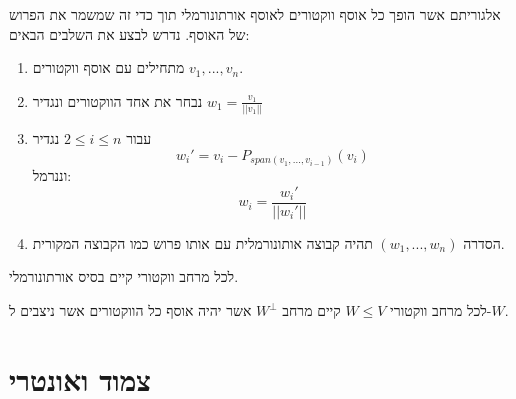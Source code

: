 \documentclass{tstextbook}
\begin{document}
\begin{proposition}
אלגוריתם אשר הופך כל אוסף ווקטורים לאוסף אורתונורמלי תוך כדי זה שמשמר את הפרוש של האוסף. נדרש לבצע את השלבים הבאים:

  \begin{enumerate}
    \item מתחילים עם אוסף ווקטורים \(v_1,...,v_n\).  


    \item נבחר את אחד הווקטורים ונגדיר \(w_1=\frac{v_1}{||v_1||}\)


    \item עבור \(2\leq i \leq n\) נגדיר 
$$w_i' = v_i - P_{span(v_1,..., v_{i-1})} (v_i)$$
וננרמל:    $$w_i = \frac{w_i'}{||w_i'||}$$


    \item הסדרה \((w_1,...,w_n)\) תהיה קבוצה אותונורמלית עם אותו פרוש כמו הקבוצה המקורית. 


  \end{enumerate}
\end{proposition}
\begin{corollary}
לכל מרחב ווקטורי קיים בסיס אורתונורמלי.

\end{corollary}
\begin{definition}
לכל מרחב ווקטורי \(W\leq V\) קיים מרחב \(W^{\perp}\) אשר יהיה אוסף כל הווקטורים אשר ניצבים ל-\(W\).

\end{definition}
\section{צמוד ואונטרי}
\end{document}
